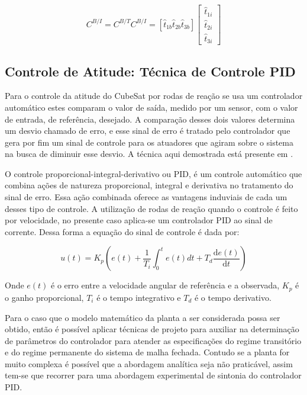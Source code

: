 \begin{equation}
C^{B/I} = C^{B/T}C^{B/I}=\left [\hat{t}_{1b} \hat{t}_{2b} \hat{t}_{3b}  \right ]
\begin{bmatrix} \hat{t}_{1i}\\\hat{t}_{2i}\\\hat{t}_{3i}
\end{bmatrix}
\end{equation}

\subsection{Controle de Atitude: Técnica de Controle PID}\label{sec:3.1.6}

Para o controle da atitude do CubeSat por rodas de reação se usa um controlador automático estes comparam o valor de saída, medido por um sensor, com o valor de entrada, de referência, desejado. A comparação desses dois valores determina um desvio chamado de erro, e esse sinal de erro é tratado pelo controlador que gera por fim um sinal de controle para os atuadores que agiram sobre o sistema na busca de diminuir esse desvio. A técnica aqui demostrada está presente em \cite[p.~21]{ogata2011engenharia}.

O controle proporcional-integral-derivativo ou PID, é um controle automático que combina ações de natureza proporcional, integral e derivativa no tratamento do sinal de erro. Essa ação combinada oferece as vantagens induviais de cada um desses tipo de controle. 
A utilização de rodas de reação quando o controle é feito por velocidade, no presente caso aplica-se um controlador PID ao sinal de corrente. Dessa forma a equação do sinal de controle é dada por:

\begin{equation}
u(t)=K_p\left(e(t)+\frac{1}{T_i}\int_{0}^{t}e(t)dt+T_d\frac{\mathrm{d}e(t) }{\mathrm{d} t}\right )
\end{equation}

Onde $e(t)$ é o erro entre a velocidade angular de referência e a observada, $K_p$ é o ganho proporcional, $T_i$ é o tempo integrativo e $T_d$ é o tempo derivativo.

Para o caso que o modelo matemático da planta a ser considerada possa ser obtido, então é possível aplicar técnicas de projeto para auxiliar na determinação de parâmetros do controlador para atender as especificações do regime transitório e do regime permanente do sistema de malha fechada. Contudo se a planta for muito complexa é possível que a abordagem analítica seja não praticável, assim tem-se que recorrer para uma abordagem experimental de sintonia do controlador PID.

